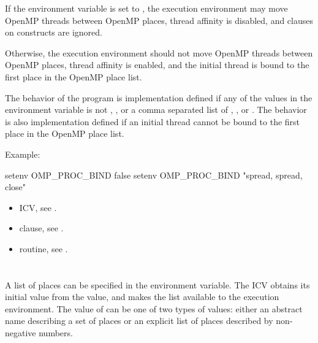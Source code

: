 If the environment variable is set to , the execution environment may move 
OpenMP threads between OpenMP places, thread affinity is disabled, and  
clauses on  constructs are ignored.

Otherwise, the execution environment should not move OpenMP threads between 
OpenMP places, thread affinity is enabled, and the initial thread is bound to the first 
place in the OpenMP place list.

The behavior of the program is implementation defined if any of the values in the 
 environment variable is not , , or a comma separated 
list of , , or . The behavior is also implementation defined if an 
initial thread cannot be bound to the first place in the OpenMP place list.

Example:
\begin{boxedcode}
setenv OMP\_PROC\_BIND false
setenv OMP\_PROC\_BIND "spread, spread, close"
\end{boxedcode}

\crossreferences
\begin{itemize}
\item {} ICV, see .

\item {} clause, see .

\item {} routine, see .
\end{itemize}









\section{}
\label{sec:OMP_PLACES}
A list of places can be specified in the  environment variable. The 
 ICV obtains its initial value from the  value, and makes the 
list available to the execution environment. The value of  can be one of 
two types of values: either an abstract name describing a set of places or an explicit list 
of places described by non-negative numbers.

